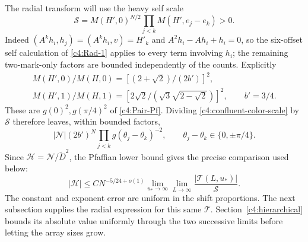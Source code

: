 The radial transform will use the heavy self scale
\begin{equation}\label{c4:heavy-self-scale}
 \mathcal S=M(H',0)^{N/2}\prod_{j<k}M(H',e_j-e_k)>0.
\end{equation}
Indeed \((A^k h_i,h_j)=(A^k h_i,v)=H'_k\) and
\(A^2 h_i-Ah_i+h_i=0\), so the six-offset self calculation of
\eqref{c4:Rad-1} applies to every term involving \(h_i\); the remaining
two-mark-only factors are bounded independently of the counts.
Explicitly
\[\begin{gathered}
 M(H',0)/M(H,0)=[(2+\sqrt2)/(2b')]^2,\\
 M(H',1)/M(H,1)=[2\sqrt2/(\sqrt3\sqrt{2-\sqrt2})]^2,\qquad b'=3/4.
\end{gathered}\]
These are \(g(0)^2,g(\pi/4)^2\) of \eqref{c4:Pair-Pf}.
Dividing \eqref{c4:confluent-color-scale} by \(\mathcal S\) therefore
leaves, within bounded factors,
\[
 |\mathscr N|(2b')^N\prod_{j<k}g(\theta_j-\theta_k)^{-2},
 \qquad \theta_j-\theta_k\in\{0,\pm\pi/4\}.
\]
Since \(\mathscr H=\mathscr N/\widetilde D^2\), the Pfaffian lower
bound gives the precise comparison used below:
\begin{equation}\label{c4:normalized-two-mark-comparison}
 |\mathscr H|\le C N^{-5/24+o(1)}
       \lim_{u_*\to\infty}\lim_{L\to\infty}
                       \frac{|\mathcal T(L,u_*)|}{\mathcal S}.
\end{equation}
The constant and exponent error are uniform in the shift proportions.
The next subsection supplies the radial expression for this same
\(\mathcal T\). Section~\ref{c4:hierarchical} bounds its absolute value
uniformly through the two successive limits before letting the array
sizes grow.
